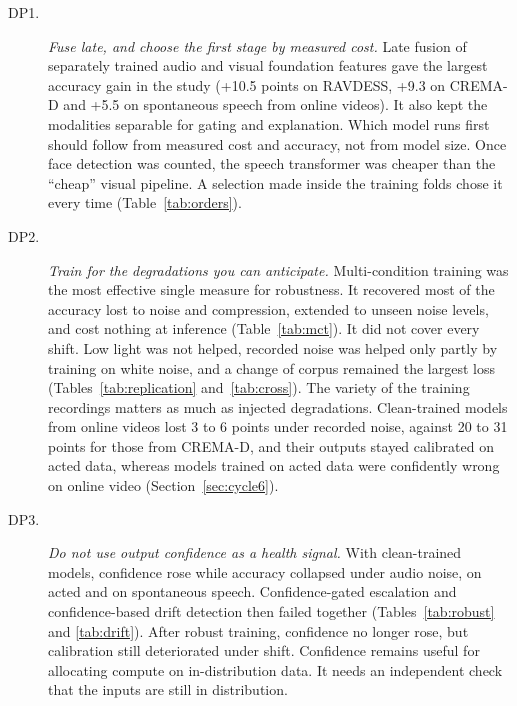 \begin{description}
\item[DP1.] \emph{Fuse late, and choose the first stage by measured cost.} Late fusion of separately trained audio and visual foundation features gave the largest accuracy gain in the study (+10.5 points on RAVDESS, +9.3 on CREMA-D and +5.5 on spontaneous speech from online videos). It also kept the modalities separable for gating and explanation. Which model runs first should follow from measured cost and accuracy, not from model size. Once face detection was counted, the speech transformer was cheaper than the ``cheap'' visual pipeline. A selection made inside the training folds chose it every time (Table~\ref{tab:orders}).
\item[DP2.] \emph{Train for the degradations you can anticipate.} Multi-condition training was the most effective single measure for robustness. It recovered most of the accuracy lost to noise and compression, extended to unseen noise levels, and cost nothing at inference (Table~\ref{tab:mct}). It did not cover every shift. Low light was not helped, recorded noise was helped only partly by training on white noise, and a change of corpus remained the largest loss (Tables~\ref{tab:replication} and~\ref{tab:cross}). The variety of the training recordings matters as much as injected degradations. Clean-trained models from online videos lost 3 to 6 points under recorded noise, against 20 to 31 points for those from CREMA-D, and their outputs stayed calibrated on acted data, whereas models trained on acted data were confidently wrong on online video (Section~\ref{sec:cycle6}).
\item[DP3.] \emph{Do not use output confidence as a health signal.} With clean-trained models, confidence rose while accuracy collapsed under audio noise, on acted and on spontaneous speech. Confidence-gated escalation and confidence-based drift detection then failed together (Tables~\ref{tab:robust} and \ref{tab:drift}). After robust training, confidence no longer rose, but calibration still deteriorated under shift. Confidence remains useful for allocating compute on in-distribution data. It needs an independent check that the inputs are still in distribution.

\end{description}
